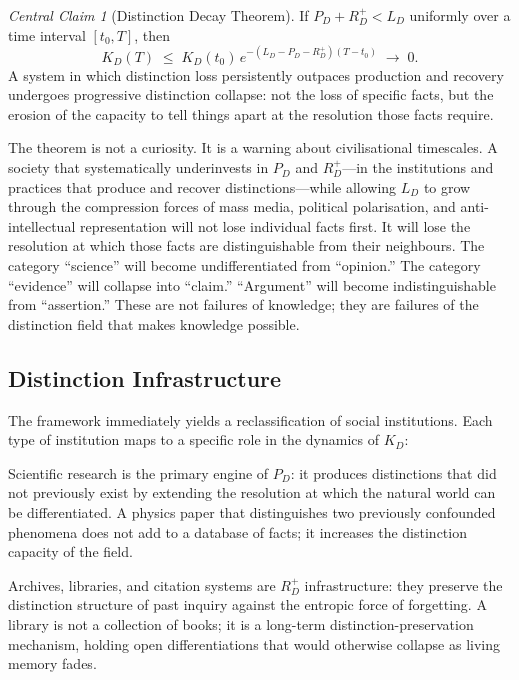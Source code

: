 \documentclass[12pt, letterpaper]{article}
\theoremstyle{remark}
\newtheorem*{claim}{Central Claim}
\begin{document}
\begin{claim}[Distinction Decay Theorem]
If $P_D + R_D^{+} < L_D$ uniformly over a time interval $[t_0, T]$,
then
\[
  K_D(T) \;\leq\; K_D(t_0)\,e^{-(L_D - P_D - R_D^{+})(T - t_0)} \;\to\; 0.
\]
A system in which distinction loss persistently outpaces production and
recovery undergoes progressive distinction collapse: not the loss of
specific facts, but the erosion of the capacity to tell things apart at
the resolution those facts require.
\end{claim}

The theorem is not a curiosity.  It is a warning about civilisational
timescales.  A society that systematically underinvests in $P_D$ and
$R_D^{+}$---in the institutions and practices that produce and recover
distinctions---while allowing $L_D$ to grow through the compression forces
of mass media, political polarisation, and anti-intellectual representation
will not lose individual facts first.  It will lose the resolution at which
those facts are distinguishable from their neighbours.  The category
``science'' will become undifferentiated from ``opinion.''  The category
``evidence'' will collapse into ``claim.''  ``Argument'' will become
indistinguishable from ``assertion.''  These are not failures of knowledge;
they are failures of the distinction field that makes knowledge possible.

\subsection{Distinction Infrastructure}

The framework immediately yields a reclassification of social institutions.
Each type of institution maps to a specific role in the dynamics of $K_D$:

Scientific research is the primary engine of $P_D$: it produces distinctions
that did not previously exist by extending the resolution at which the natural
world can be differentiated.  A physics paper that distinguishes two previously
confounded phenomena does not add to a database of facts; it increases the
distinction capacity of the field.

Archives, libraries, and citation systems are $R_D^{+}$ infrastructure: they
preserve the distinction structure of past inquiry against the entropic force
of forgetting.  A library is not a collection of books; it is a long-term
distinction-preservation mechanism, holding open differentiations that would
otherwise collapse as living memory fades.
\end{document}
